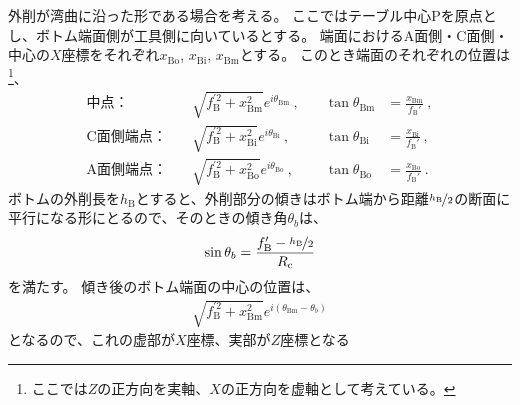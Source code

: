 \clearpage
外削が湾曲に沿った形である場合を考える。
ここではテーブル中心Pを原点とし、ボトム端面側が工具側に向いているとする。
端面におけるA面側・C面側・中心の$X$座標をそれぞれ$x_\mathrm{Bo}$, $x_\mathrm{Bi}$, $x_\mathrm{Bm}$とする。
このとき端面のそれぞれの位置は
\footnote{ここでは$Z$の正方向を実軸、$X$の正方向を虚軸として考えている。}、
\begin{subequations}
\begin{alignat*}{2}
  \text{中点：}&\quad
  \sqrt{f_\mathrm B^{'2}+x_\mathrm{Bm}^2}e^{i\theta_\mathrm{Bm}}~, \quad &
  \tan\theta_\mathrm{Bm} &= \frac{x_\mathrm{Bm}}{f_\mathrm B'}\ ,\\
  \text{C面側端点：}&\quad
  \sqrt{f_\mathrm B^{'2}+x_\mathrm{Bi}^2}e^{i\theta_\mathrm{Bi}}~, \quad &
  \tan\theta_\mathrm{Bi} &= \frac{x_\mathrm{Bi}}{f_\mathrm B'}\ ,\\
  \text{A面側端点：}&\quad
  \sqrt{f_\mathrm B^{'2}+x_\mathrm{Bo}^2}e^{i\theta_\mathrm{Bo}}~, \quad &
  \tan\theta_\mathrm{Bo} &= \frac{x_\mathrm{Bo}}{f_\mathrm B'}\ .
\end{alignat*}
\end{subequations}
ボトムの外削長を$h_\mathrm B$とすると、外削部分の傾きはボトム端から距離$\nicefrac{h_\mathrm B}2$の断面に平行になる形にとるので、そのときの傾き角$\theta_b$は、
\begin{align*}
  \sin\theta_b = \frac{f_\mathrm B'-\nicefrac{h_\mathrm B}2}{R_\mathrm c}
\end{align*}
を満たす。
傾き後のボトム端面の中心の位置は、
\begin{align*}
  \sqrt{f_\mathrm B^{'2}+x_\mathrm{Bm}^2}e^{i(\theta_\mathrm{Bm}-\theta_b)}
\end{align*}
となるので、これの虚部が$X$座標、実部が$Z$座標となる
